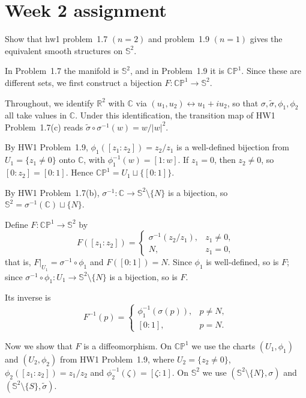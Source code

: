 \section*{Week 2 assignment}


Show that hw1 problem~1.7 $(n = 2)$ and problem~1.9 $(n=1)$ gives the equivalent smooth structures on $\mathbb{S}^2$. 
\answer{}

In Problem~1.7 the manifold is $\mathbb{S}^2$, and in Problem~1.9 it is $\mathbb{CP}^1$. Since these are different sets, we first construct a bijection $F:\mathbb{CP}^1\to\mathbb{S}^2$.


Throughout, we identify $\mathbb{R}^2$ with $\mathbb{C}$ via $(u_1,u_2)\leftrightarrow u_1+iu_2$, so that $\sigma,\tilde\sigma,\phi_1,\phi_2$ all take values in $\mathbb{C}$. Under this identification, the transition map of HW1 Problem~1.7(c) reads
$\tilde\sigma\circ\sigma^{-1}(w)=w/|w|^2$.



By HW1 Problem~1.9, $\phi_1([z_1:z_2])=z_2/z_1$ is a well-defined bijection from $U_1=\{z_1\neq 0\}$ onto $\mathbb{C}$, with $\phi_1^{-1}(w)=[1:w]$. If $z_1=0$, then $z_2\neq 0$, so $[0:z_2]=[0:1]$. Hence $\mathbb{CP}^1=U_1\sqcup\{[0:1]\}$.

By HW1 Problem~1.7(b), $\sigma^{-1}:\mathbb{C}\to\mathbb{S}^2\setminus\{N\}$ is a bijection, so $\mathbb{S}^2=\sigma^{-1}(\mathbb{C})\sqcup\{N\}$.

Define $F:\mathbb{CP}^1\to\mathbb{S}^2$ by
\begin{equation}
    F([z_1:z_2]) =
    \begin{cases}
        \sigma^{-1}(z_2/z_1), & z_1\neq 0,\\
        N, & z_1 = 0,
    \end{cases}
\end{equation}
that is, $F|_{U_1}=\sigma^{-1}\circ\phi_1$ and $F([0:1])=N$. Since $\phi_1$ is well-defined, so is $F$; since $\sigma^{-1}\circ\phi_1:U_1\to\mathbb{S}^2\setminus\{N\}$ is a bijection, so is $F$.

Its inverse is
\begin{equation}
    F^{-1}(p) =
    \begin{cases}
        \phi_1^{-1}(\sigma(p)), & p\neq N,\\
        [0:1], & p = N.
    \end{cases}
\end{equation}

Now we show that $F$ is a diffeomorphism. On $\mathbb{CP}^1$ we use the charts $(U_1,\phi_1)$ and $(U_2,\phi_2)$ from HW1 Problem~1.9, where $U_2=\{z_2\neq 0\}$, $\phi_2([z_1:z_2])=z_1/z_2$ and $\phi_2^{-1}(\zeta)=[\zeta:1]$. On $\mathbb{S}^2$ we use $(\mathbb{S}^2\setminus\{N\},\sigma)$ and $(\mathbb{S}^2\setminus\{S\},\tilde\sigma)$.


